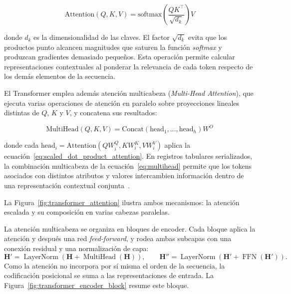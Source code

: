 \begin{equation}
\text{Attention}(Q, K, V) = \text{softmax}\!\left(\frac{Q K^\top}{\sqrt{d_k}}\right) V
\label{eq:scaled_dot_product_attention}
\end{equation}

donde $d_k$ es la dimensionalidad de las claves. El factor $\sqrt{d_k}$ evita que los productos punto alcancen magnitudes que saturen la función \textit{softmax} y produzcan gradientes demasiado pequeños. Esta operación permite calcular representaciones contextuales al ponderar la relevancia de cada token respecto de los demás elementos de la secuencia.

El Transformer emplea además atención multicabeza (\textit{Multi-Head Attention}), que ejecuta varias operaciones de atención en paralelo sobre proyecciones lineales distintas de $Q$, $K$ y $V$, y concatena sus resultados:

\begin{equation}
\text{MultiHead}(Q, K, V) = \text{Concat}(\text{head}_1, \dots, \text{head}_h) W^O
\label{eq:multihead}
\end{equation}

donde cada $\text{head}_i = \text{Attention}(Q W_i^Q, K W_i^K, V W_i^V)$ aplica la ecuación~\ref{eq:scaled_dot_product_attention}. En registros tabulares serializados, la combinación multicabeza de la ecuación~\ref{eq:multihead} permite que los tokens asociados con distintos atributos y valores intercambien información dentro de una representación contextual conjunta~\cite{li2020}.

La Figura~\ref{fig:transformer_attention} ilustra ambos mecanismos: la atención escalada y su composición en varias cabezas paralelas.


La atención multicabeza se organiza en bloques de encoder. Cada bloque aplica la atención y después una red \textit{feed-forward}, y rodea ambas subcapas con una conexión residual y una normalización de capa:
\[
\mathbf{H}' = \operatorname{LayerNorm}\!\left(\mathbf{H} + \operatorname{MultiHead}(\mathbf{H})\right),
\qquad
\mathbf{H}'' = \operatorname{LayerNorm}\!\left(\mathbf{H}' + \operatorname{FFN}(\mathbf{H}')\right).
\]
Como la atención no incorpora por sí misma el orden de la secuencia, la codificación posicional se suma a las representaciones de entrada. La Figura~\ref{fig:transformer_encoder_block} resume este bloque.


